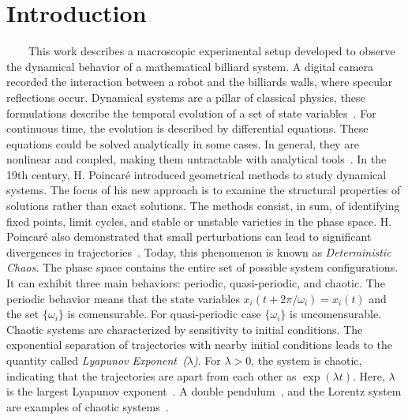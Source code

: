 \documentclass[pdflatex,sn-mathphys-num,iicol]{sn-jnl}%
\theoremstyle{thmstyleone}%
\theoremstyle{thmstyletwo}%
\theoremstyle{thmstylethree}%
\begin{document}



\maketitle

\section{Introduction}
\label{intro}

\ \ \ \ This work describes a macroscopic experimental setup developed to observe the dynamical behavior of a mathematical billiard system. A digital camera recorded the interaction between a robot and the billiards walls, where specular reflections occur. Dynamical systems are a pillar of classical physics, these formulations describe the temporal evolution of a set of state variables~\cite{ott:2002}. For continuous time, the evolution is described by differential equations. These equations could be solved analytically in some cases. In general, they are nonlinear and coupled, making them untractable with analytical tools~\cite{str:2018}. In the 19th century, H. Poincaré introduced geometrical methods to study dynamical systems. The focus of his new approach is to examine the structural properties of solutions rather than exact solutions. The methods consist, in sum, of identifying fixed points, limit cycles, and stable or unstable varieties in the phase space. H. Poincaré also demonstrated that small perturbations can lead to significant divergences in trajectories~\cite {poi:1899}. Today, this phenomenon is known as \textit{Deterministic Chaos.} The phase space contains the entire set of possible system configurations. It can exhibit three main behaviors: periodic, quasi-periodic, and chaotic. The periodic behavior means that the state variables $x_i (t + 2\pi/\omega_i) = x_i(t)$ and the set $\{ \omega_i\}$ is comensurable. For quasi-periodic case $\{ \omega_i\}$ is uncomensurable. Chaotic systems are characterized by sensitivity to initial conditions. The exponential separation of trajectories with nearby initial conditions leads to the quantity called \textit{Lyapunov Exponent~($\lambda$)}. For $\lambda>0$, the system is chaotic, indicating that the trajectories are apart from each other as $\exp(\lambda t)$. Here, $\lambda$ is the largest Lyapunov exponent~\cite{ben:1976}. A double pendulum~\cite{stg:1992}, and the Lorentz system are examples of chaotic systems~\cite{lor:1963}.
\end{document}
